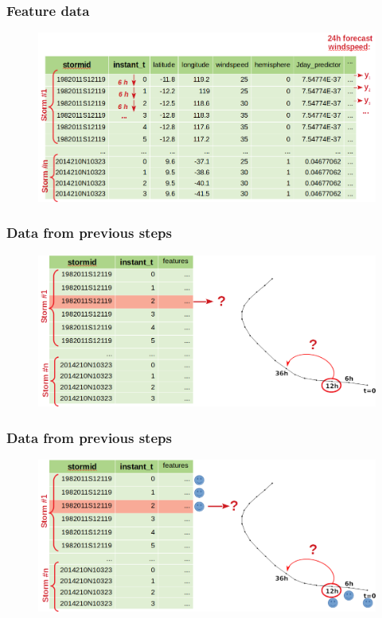\documentclass[handout]{beamer}
\begin{document}
\begin{frame}
\frametitle{Feature data}
	\begin{figure}
	\centering
		\includegraphics[width=0.9\linewidth]{fig/L1/feature_data2.png}

	\end{figure}

\end{frame}


\begin{frame}
\frametitle{Data from \textbf{previous} steps}
\begin{figure}
	\includegraphics[width=0.95\linewidth]{fig/L1/data_lookahead.png} \\
\end{figure}

\end{frame}


\begin{frame}
\frametitle{Data from \textbf{previous} steps}
\begin{figure}
	\includegraphics[width=0.95\linewidth]{fig/L1/data_lookahead2.png} \\
\end{figure}

\end{frame}
\end{document}
